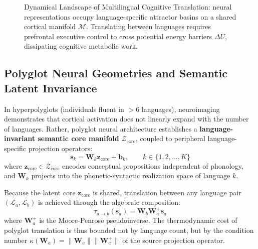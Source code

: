 \documentclass[11pt,letterpaper]{article}
\begin{document}
\begin{figure}[htbp]
{%
}
\caption{Dynamical Landscape of Multilingual Cognitive Translation: neural representations occupy language-specific attractor basins on a shared cortical manifold $\mathcal{M}$. Translating between languages requires prefrontal executive control to cross potential energy barriers $\Delta U$, dissipating cognitive metabolic work.}
\label{fig:multilingual_dynamics}
\end{figure}

\subsection{Polyglot Neural Geometries and Semantic Latent Invariance}
In hyperpolyglots (individuals fluent in $>6$ languages), neuroimaging demonstrates that cortical activation does not linearly expand with the number of languages. Rather, polyglot neural architecture establishes a \textbf{language-invariant semantic core manifold} $\mathcal{Z}_{\text{core}}$, coupled to peripheral language-specific projection operators:
\begin{equation}
\mathbf{s}_k = \mathbf{W}_k \mathbf{z}_{\text{core}} + \mathbf{b}_k, \qquad k \in \{1, 2, \dots, K\}
\end{equation}
where $\mathbf{z}_{\text{core}} \in \mathcal{Z}_{\text{core}}$ encodes conceptual propositions independent of phonology, and $\mathbf{W}_k$ projects into the phonetic-syntactic realization space of language $k$.

Because the latent core $\mathbf{z}_{\text{core}}$ is shared, translation between any language pair $(\mathcal{L}_a, \mathcal{L}_b)$ is achieved through the algebraic composition:
\begin{equation}
\tau_{a \to b}(\mathbf{s}_a) = \mathbf{W}_b \mathbf{W}_a^+ \mathbf{s}_a
\end{equation}
where $\mathbf{W}_a^+$ is the Moore-Penrose pseudoinverse. The thermodynamic cost of polyglot translation is thus bounded not by language count, but by the condition number $\kappa(\mathbf{W}_a) = \|\mathbf{W}_a\| \|\mathbf{W}_a^+\|$ of the source projection operator.
\end{document}

